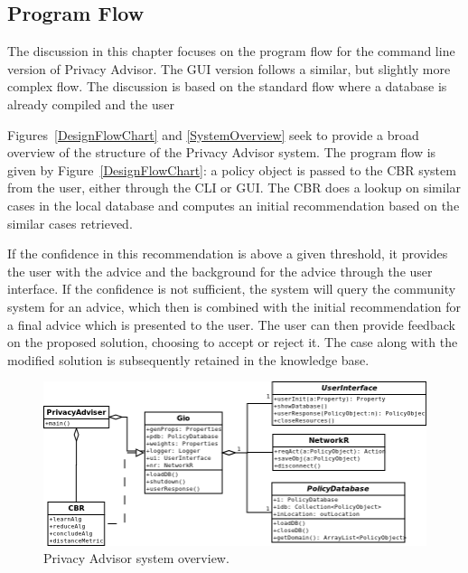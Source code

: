 \subsection{Program Flow}
The discussion in this chapter focuses on the program flow for the command line version of Privacy Advisor. The GUI version follows a similar, but slightly more complex flow. The discussion is based on the standard flow where a database is already compiled and the user 

Figures~\ref{DesignFlowChart} and \ref{SystemOverview} seek to provide a broad overview of the structure of the Privacy Advisor system. The program flow is given by Figure~\ref{DesignFlowChart}: a policy object is passed to the CBR system from the user, either through the CLI or GUI. The CBR does a lookup on similar cases in the local database and computes an initial recommendation based on the similar cases retrieved. 

If the confidence in this recommendation is above a given threshold, it provides the user with the advice and the background for the advice through the user interface. If the confidence is not sufficient, the system will query the community system for an advice, which then is combined with the initial recommendation for a final advice which is presented to the user. The user can then provide feedback on the proposed solution, choosing to accept or reject it. The case along with the modified solution is subsequently retained in the knowledge base.

\begin{figure}[htbp]
\begin{center}
\includegraphics[width = \textwidth]{DesignReport/uml/main_2.png}
\caption{Privacy Advisor system overview.}
\label{overviewFig}
\end{center}
\end{figure}


